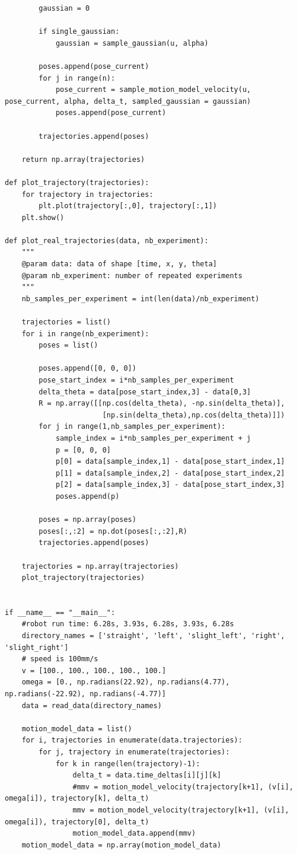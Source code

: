 \documentclass[a4paper, 12pt]{article}
\begin{document}
\begin{lstlisting}
        gaussian = 0
        
        if single_gaussian:
            gaussian = sample_gaussian(u, alpha)
        
        poses.append(pose_current)
        for j in range(n):
            pose_current = sample_motion_model_velocity(u, pose_current, alpha, delta_t, sampled_gaussian = gaussian)
            poses.append(pose_current)
        
        trajectories.append(poses)
    
    return np.array(trajectories)
        
def plot_trajectory(trajectories):
    for trajectory in trajectories:
        plt.plot(trajectory[:,0], trajectory[:,1])
    plt.show()
    
def plot_real_trajectories(data, nb_experiment):
    """
    @param data: data of shape [time, x, y, theta]
    @param nb_experiment: number of repeated experiments
    """
    nb_samples_per_experiment = int(len(data)/nb_experiment)
    
    trajectories = list()
    for i in range(nb_experiment):
        poses = list()
        
        poses.append([0, 0, 0])
        pose_start_index = i*nb_samples_per_experiment
        delta_theta = data[pose_start_index,3] - data[0,3]
        R = np.array([[np.cos(delta_theta), -np.sin(delta_theta)],
                       [np.sin(delta_theta),np.cos(delta_theta)]])
        for j in range(1,nb_samples_per_experiment):
            sample_index = i*nb_samples_per_experiment + j
            p = [0, 0, 0]
            p[0] = data[sample_index,1] - data[pose_start_index,1]
            p[1] = data[sample_index,2] - data[pose_start_index,2]
            p[2] = data[sample_index,3] - data[pose_start_index,3]
            poses.append(p)
        
        poses = np.array(poses)
        poses[:,:2] = np.dot(poses[:,:2],R)
        trajectories.append(poses)
    
    trajectories = np.array(trajectories)
    plot_trajectory(trajectories)


if __name__ == "__main__":
    #robot run time: 6.28s, 3.93s, 6.28s, 3.93s, 6.28s
    directory_names = ['straight', 'left', 'slight_left', 'right', 'slight_right']
    # speed is 100mm/s
    v = [100., 100., 100., 100., 100.]
    omega = [0., np.radians(22.92), np.radians(4.77), np.radians(-22.92), np.radians(-4.77)]
    data = read_data(directory_names)

    motion_model_data = list()
    for i, trajectories in enumerate(data.trajectories):
        for j, trajectory in enumerate(trajectories):
            for k in range(len(trajectory)-1):
                delta_t = data.time_deltas[i][j][k]
                #mmv = motion_model_velocity(trajectory[k+1], (v[i], omega[i]), trajectory[k], delta_t)
                mmv = motion_model_velocity(trajectory[k+1], (v[i], omega[i]), trajectory[0], delta_t)
                motion_model_data.append(mmv)
    motion_model_data = np.array(motion_model_data)



\end{lstlisting}
\end{document}
